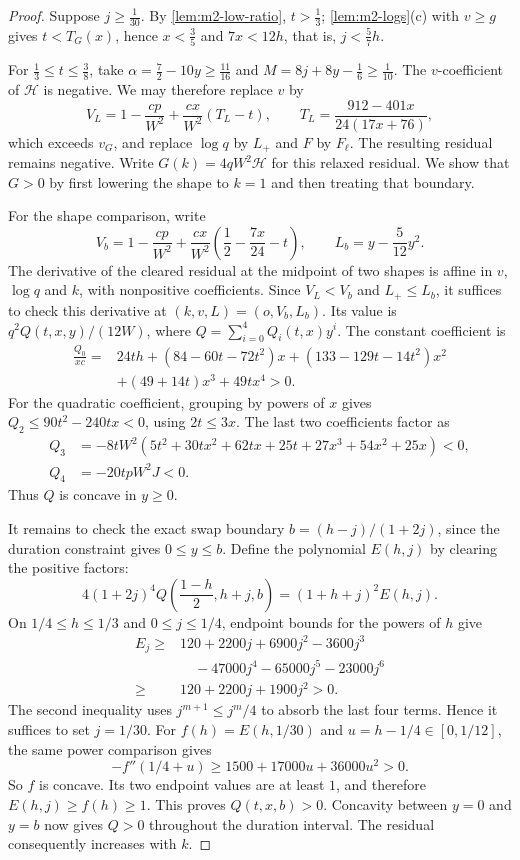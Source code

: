\begin{proof}
Suppose $j\ge\frac1{30}$. By \cref{lem:m2-low-ratio}, $t>\frac13$; \cref{lem:m2-logs}(c) with
$v\ge g$ gives $t<T_G(x)$, hence $x<\frac35$ and $7x<12h$, that is, $j<\frac57h$.

For $\frac13\le t\le\frac38$, take
$\alpha=\frac72-10y\ge\frac{11}{16}$ and
$M=8j+8y-\frac16\ge\frac1{10}$.
The $v$-coefficient of $\mathcal H$ is negative. We may therefore replace $v$ by
\[
 V_L=1-\frac{cp}{W^2}+\frac{cx}{W^2}(T_L-t),
 \qquad T_L=\frac{912-401x}{24(17x+76)},
\]
which exceeds $v_G$, and replace $\log q$ by $L_+$ and $F$ by $F_\ell$.
The resulting residual remains negative. Write $G(k)=4qW^2\mathcal H$ for this
relaxed residual. We show that $G>0$ by first lowering the shape to $k=1$ and then treating that boundary.

For the shape comparison, write
\[
 V_b=1-\frac{cp}{W^2}+\frac{cx}{W^2}
           \left(\frac12-\frac{7x}{24}-t\right),
 \qquad L_b=y-\frac5{12}y^2.
\]
The derivative of the cleared residual at the midpoint of two shapes is affine in $v$, $\log q$ and $k$,
with nonpositive coefficients. Since $V_L<V_b$ and $L_+\le L_b$, it suffices to
check this derivative at $(k,v,L)=(o,V_b,L_b)$.
Its value is $q^2Q(t,x,y)/(12W)$, where $Q=\sum_{i=0}^4Q_i(t,x)y^i$.
The constant coefficient is
\begin{align*}
 \frac{Q_0}{xc}={}&24th+(84-60t-72t^2)x+(133-129t-14t^2)x^2\\
                 &+(49+14t)x^3+49tx^4>0.
\end{align*}
For the quadratic coefficient, grouping by powers of $x$ gives
$Q_2\le90t^2-240tx<0$, using $2t\le3x$.
The last two coefficients factor as
\begin{align*}
 Q_3&=-8tW^2(5t^2+30tx^2+62tx+25t+27x^3+54x^2+25x)<0,\\
 Q_4&=-20tpW^2J<0.
\end{align*}
Thus $Q$ is concave in $y\ge0$.

It remains to check the exact swap boundary
$b=(h-j)/(1+2j)$, since the duration constraint gives $0\le y\le b$.
Define the polynomial $E(h,j)$ by clearing the positive factors:
\[
 4(1+2j)^4 Q\left(\frac{1-h}{2},h+j,b\right)
       =(1+h+j)^2E(h,j).
\]
On $1/4\le h\le1/3$ and $0\le j\le1/4$, endpoint bounds for the powers of $h$ give
\begin{align*}
 E_j\ge{}&120+2200j+6900j^2-3600j^3\\
         &\quad-47000j^4-65000j^5-23000j^6\\
    \ge{}&120+2200j+1900j^2>0.
\end{align*}
The second inequality uses $j^{m+1}\le j^m/4$ to absorb the last four terms.
Hence it suffices to set $j=1/30$.
For $f(h)=E(h,1/30)$ and $u=h-1/4\in[0,1/12]$, the same power comparison gives
\[
 -f''(1/4+u)\ge1500+17000u+36000u^2>0.
\]
So $f$ is concave. Its two endpoint values are at least $1$, and therefore
$E(h,j)\ge f(h)\ge1$.
This proves $Q(t,x,b)>0$. Concavity between $y=0$ and $y=b$ now gives $Q>0$
throughout the duration interval. The residual consequently increases with $k$.


\end{proof}
